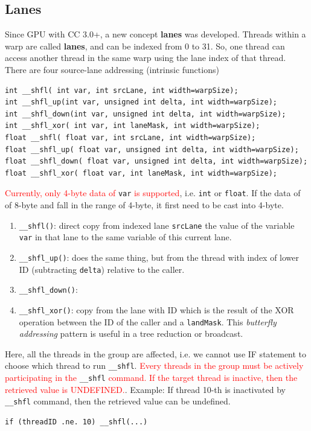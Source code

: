 \subsection{Lanes}
\label{sec:lanes_thread}


Since GPU with CC 3.0+, a new concept {\bf lanes} was developed.  Threads within
a warp are called {\bf lanes}, and can be indexed from 0 to 31. So, one thread
can access another thread in the same warp using the lane index of that thread.
There are four source-lane addressing (intrinsic functions)
\begin{verbatim}
int __shfl( int var, int srcLane, int width=warpSize);
int __shfl_up(int var, unsigned int delta, int width=warpSize);
int __shfl_down(int var, unsigned int delta, int width=warpSize);
int __shfl_xor( int var, int laneMask, int width=warpSize);
float __shfl( float var, int srcLane, int width=warpSize);
float __shfl_up( float var, unsigned int delta, int width=warpSize);
float __shfl_down( float var, unsigned int delta, int width=warpSize);
float __shfl_xor( float var, int laneMask, int width=warpSize);
\end{verbatim} 

\textcolor{red}{Currently, only 4-byte data of} \verb!var! \textcolor{red}{is
supported}, i.e. \verb!int! or \verb!float!. If the data of of 8-byte and fall
in the range of 4-byte, it first need to be cast into 4-byte. 

\begin{enumerate}
  \item \verb!__shfl()!: direct copy from indexed lane \verb!srcLane! the value
  of the variable \verb!var! in that lane to the same variable of this current
  lane.
  \item \verb!__shfl_up()!: does the same thing, but from the thread with
  index of lower ID (subtracting \verb!delta!) relative to the caller.
  \item \verb!__shfl_down()!:
  \item \verb!__shfl_xor()!:  copy from the lane with ID which is the
  result of the XOR operation between the ID of the caller and a
  \verb!landMask!. This {\it butterfly addressing} pattern is useful in a tree
  reduction or broadcast. 
\end{enumerate}

Here, all the threads in the group are affected, i.e. we cannot use IF statement
to choose which thread to run \verb!__shfl!. \textcolor{red}{Every threads in
the group must be actively participating in the} \verb!__shfl!
\textcolor{red}{command. If the target thread is inactive, then the retrieved
value is UNDEFINED.}. Example: If thread 10-th is inactivated by \verb!__shfl!
command, then the retrieved value can be undefined.
\begin{verbatim}  
if (threadID .ne. 10) __shfl(...)
\end{verbatim}

